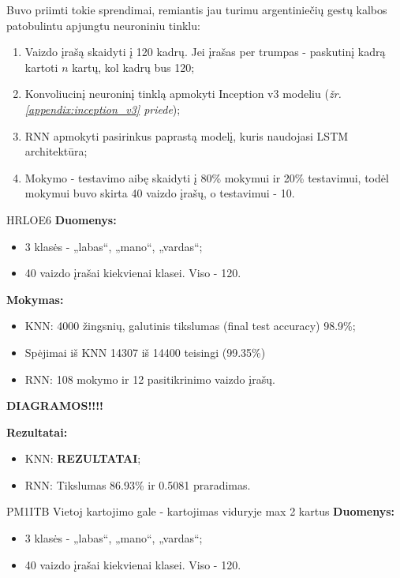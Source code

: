 \documentclass{VUMIFPSbakalaurinis}
\begin{document}
Buvo priimti tokie sprendimai, remiantis jau turimu argentiniečių gestų kalbos patobulintu apjungtu neuroniniu tinklu:
\begin{enumerate}
	\item Vaizdo įrašą skaidyti į 120 kadrų. Jei įrašas per trumpas - paskutinį kadrą kartoti $n$ kartų, kol kadrų bus 120;
	\item Konvoliucinį neuroninį tinklą apmokyti Inception v3 modeliu (\textit{žr. \ref{appendix:inception_v3} priede});
	\item RNN apmokyti pasirinkus paprastą modelį, kuris naudojasi LSTM architektūra;
	\item Mokymo - testavimo aibę skaidyti į 80\% mokymui ir 20\% testavimui, todėl mokymui buvo skirta 40 vaizdo įrašų, o testavimui - 10.
\end{enumerate}

HRLOE6
\textbf{Duomenys:}
\begin{itemize}
	\item 3 klasės - „labas“, „mano“, „vardas“;
	\item 40 vaizdo įrašai kiekvienai klasei. Viso - 120.
\end{itemize}

\textbf{Mokymas:}
\begin{itemize}
	\item KNN: 4000 žingsnių, galutinis tikslumas (final test accuracy) 98.9\%;
	\item Spėjimai iš KNN 14307 iš 14400 teisingi (99.35\%)
	\item RNN: 108 mokymo ir 12 pasitikrinimo vaizdo įrašų.
\end{itemize}

\textbf{DIAGRAMOS!!!!}

\textbf{Rezultatai:}
\begin{itemize}
	\item KNN: \textbf{REZULTATAI};
	\item RNN: Tikslumas 86.93\% ir 0.5081 praradimas.
\end{itemize}



PM1ITB
Vietoj kartojimo gale - kartojimas viduryje max 2 kartus
\textbf{Duomenys:}
\begin{itemize}
	\item 3 klasės - „labas“, „mano“, „vardas“;
	\item 40 vaizdo įrašai kiekvienai klasei. Viso - 120.
\end{itemize}
\end{document}
